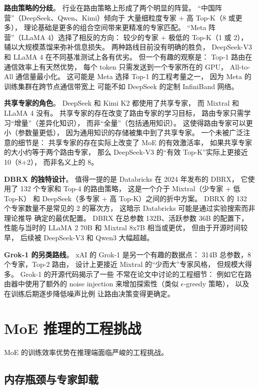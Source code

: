 \textbf{路由策略的分歧}。
行业在路由策略上形成了两个明显的阵营。
“中国阵营”（DeepSeek、Qwen、Kimi）倾向于
大量细粒度专家 + 高 Top-K（8 或更多），
理论基础是更多的组合空间带来更精准的专家匹配。
“Meta 阵营”（LLaMA 4）选择了相反的方向：
较少的专家 + 极低的 Top-K（1 或 2），
辅以大规模蒸馏来弥补信息损失。
两种路线目前没有明确的胜负，
DeepSeek-V3 和 LLaMA 4 在不同基准测试上各有优劣。
但一个有趣的观察是：
Top-1 路由在通信效率上有天然优势，
每个 token 只需发送到一个专家所在的 GPU，
All-to-All 通信量最小化。
这可能是 Meta 选择 Top-1 的工程考量之一，
因为 Meta 的训练集群在跨节点通信带宽上
可能不如 DeepSeek 的定制 InfiniBand 网络。

\textbf{共享专家的角色}。
DeepSeek 和 Kimi K2 都使用了共享专家，
而 Mixtral 和 LLaMA 4 没有。
共享专家的存在改变了路由专家的学习目标，
路由专家只需学习“增量”（差异化知识），
而非“全量”（包括通用知识）。
这使得路由专家可以更小（参数量更低），
因为通用知识的存储被集中到了共享专家。
一个未被广泛注意的细节是：
共享专家的存在实际上改变了 MoE 的有效激活率，
如果共享专家的大小约等于两个路由专家，
那么 DeepSeek-V3 的“有效 Top-K”实际上更接近 10（8+2），
而非名义上的 8。

\textbf{DBRX 的独特设计}。%
值得一提的是 Databricks 在 2024 年发布的 DBRX，
它使用了 132 个专家和 Top-4 的路由策略，
这是一个介于 Mixtral（少专家 + 低 Top-K）
和 DeepSeek（多专家 + 高 Top-K）之间的折中方案。
DBRX 的 132 个专家数量不是常见的 2 的幂次方，
这暗示 Databricks 可能是通过实验搜索而非理论推导
确定的最优配置。
DBRX 在总参数 132B、活跃参数 36B 的配置下，
性能与当时的 LLaMA 2 70B 和 Mixtral 8x7B 相当或更优，
但由于开源时间较早，
后续被 DeepSeek-V3 和 Qwen3 大幅超越。

\textbf{Grok-1 的另类路线}。
xAI 的 Grok-1 是另一个有趣的数据点：
314B 总参数，8 个专家，Top-2 路由，
设计上更接近 Mixtral 的“少而大”专家风格，
但规模大得多。
Grok-1 的开源代码揭示了一些
不常在论文中讨论的工程细节：
例如它在路由器中使用了额外的 noise injection
来增加探索性（类似 $\epsilon$-greedy 策略），
以及在训练后期逐步降低噪声比例
让路由决策变得更确定。

\section{MoE 推理的工程挑战}
\label{sec:moe-inference}

MoE 的训练效率优势在推理端面临严峻的工程挑战。

\subsection{内存瓶颈与专家卸载}

